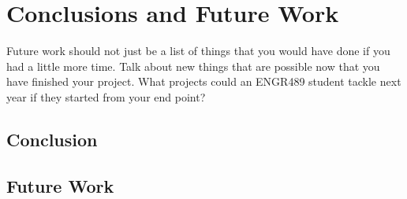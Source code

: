 \chapter{Conclusions and Future Work}\label{C:conclusion} 

Future work should not just be a list of things that you would have done if you had a little more time. Talk about new things that are possible now that you have finished your project. What projects could an ENGR489 student tackle next year if they started from your end point? 

\section{Conclusion}

\section{Future Work}